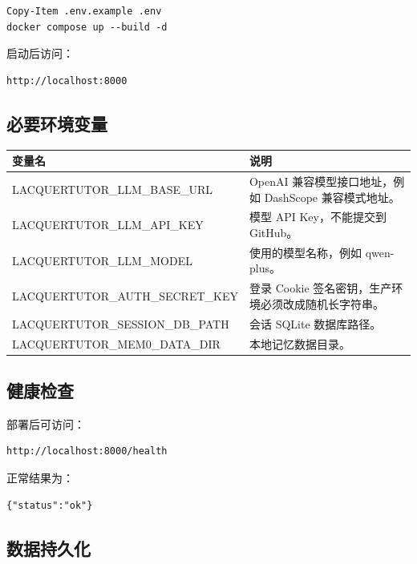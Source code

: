 \documentclass[UTF8,a4paper,12pt]{ctexart}
\begin{document}
\begin{lstlisting}
Copy-Item .env.example .env
docker compose up --build -d
\end{lstlisting}

启动后访问：

\begin{lstlisting}
http://localhost:8000
\end{lstlisting}

\subsection{必要环境变量}

\begin{longtable}{>{\raggedright\arraybackslash\ttfamily\footnotesize}p{6.4cm}>{\raggedright\arraybackslash}p{6.6cm}}
\hline
\normalfont\textbf{变量名} & \textbf{说明} \\
\hline
LACQUERTUTOR\_LLM\_BASE\_URL & OpenAI 兼容模型接口地址，例如 DashScope 兼容模式地址。 \\
LACQUERTUTOR\_LLM\_API\_KEY & 模型 API Key，不能提交到 GitHub。 \\
LACQUERTUTOR\_LLM\_MODEL & 使用的模型名称，例如 qwen-plus。 \\
LACQUERTUTOR\_AUTH\_SECRET\_KEY & 登录 Cookie 签名密钥，生产环境必须改成随机长字符串。 \\
LACQUERTUTOR\_SESSION\_DB\_PATH & 会话 SQLite 数据库路径。 \\
LACQUERTUTOR\_MEM0\_DATA\_DIR & 本地记忆数据目录。 \\
\hline
\end{longtable}

\subsection{健康检查}

部署后可访问：

\begin{lstlisting}
http://localhost:8000/health
\end{lstlisting}

正常结果为：

\begin{lstlisting}
{"status":"ok"}
\end{lstlisting}

\subsection{数据持久化}
\end{document}
